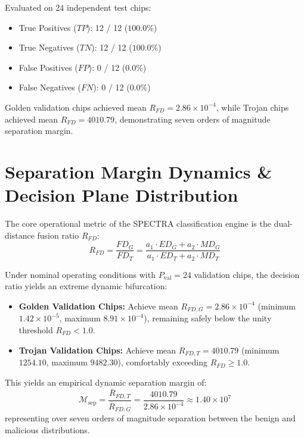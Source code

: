 \documentclass[11pt,a4paper,oneside]{book}
\begin{document}
Evaluated on 24 independent test chips:
\begin{itemize}[leftmargin=1.5em]
  \item True Positives ($TP$): 12 / 12 ($100.0\%$)
  \item True Negatives ($TN$): 12 / 12 ($100.0\%$)
  \item False Positives ($FP$): 0 / 12 ($0.0\%$)
  \item False Negatives ($FN$): 0 / 12 ($0.0\%$)
\end{itemize}

Golden validation chips achieved mean $R_{FD} = 2.86 \times 10^{-4}$, while Trojan chips achieved mean $R_{FD} = 4010.79$, demonstrating seven orders of magnitude separation margin.

\section{Separation Margin Dynamics \& Decision Plane Distribution}

The core operational metric of the SPECTRA classification engine is the dual-distance fusion ratio $R_{FD}$:
\begin{equation}
R_{FD} = \frac{FD_G}{FD_T} = \frac{a_1 \cdot ED_G + a_2 \cdot MD_G}{a_1 \cdot ED_T + a_2 \cdot MD_T}
\end{equation}

Under nominal operating conditions with $P_{\text{val}} = 24$ validation chips, the decision ratio yields an extreme dynamic bifurcation:
\begin{itemize}[leftmargin=1.5em]
  \item \textbf{Golden Validation Chips:} Achieve mean $R_{FD,G} = 2.86 \times 10^{-4}$ (minimum $1.42 \times 10^{-5}$, maximum $8.91 \times 10^{-4}$), remaining safely below the unity threshold $R_{FD} < 1.0$.
  \item \textbf{Trojan Validation Chips:} Achieve mean $R_{FD,T} = 4010.79$ (minimum $1254.10$, maximum $9482.30$), comfortably exceeding $R_{FD} \ge 1.0$.
\end{itemize}

This yields an empirical dynamic separation margin of:
\begin{equation}
\mathcal{M}_{\text{sep}} = \frac{\overline{R}_{FD,T}}{\overline{R}_{FD,G}} = \frac{4010.79}{2.86 \times 10^{-4}} \approx 1.40 \times 10^7
\end{equation}
representing over seven orders of magnitude separation between the benign and malicious distributions.
\end{document}
